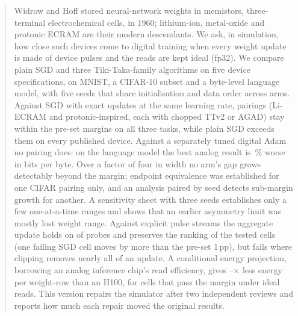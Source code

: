 \begin{abstract}
Widrow and Hoff stored neural-network weights in memistors, three-terminal electrochemical cells, in 1960; lithium-ion,
metal-oxide and protonic ECRAM are their modern descendants. We ask, in simulation, how close such devices come to digital
training when every weight update is made of device pulses and the reads are kept ideal (fp32). We compare plain SGD and three
Tiki-Taka-family algorithms on five device specifications, on MNIST, a CIFAR-10 subset and a byte-level language model, with five
seeds that share initialisation and data order across arms. Against SGD with exact updates at the same learning rate,
\RVAllThreeFpN{} pairings (Li-ECRAM and protonic-inspired, each with chopped TTv2 or AGAD) stay within the pre-set margins on all
three tasks, while plain SGD exceeds them on every published device. Against a separately tuned digital Adam no pairing does: on
the language model the best analog result is \RVLmAdamBestGap\,\% worse in bits per byte. Over a factor of four in width no
arm's gap grows detectably beyond the margin; endpoint equivalence was established for one CIFAR pairing only, and an analysis
paired by seed detects sub-margin growth for another. A sensitivity sheet with three seeds establishes only a few one-at-a-time
ranges and shows that an earlier asymmetry limit was mostly lost weight range. Against explicit pulse streams the aggregate
update holds on \RXProbeSurPassN{} of \RXProbeN{} probes and preserves the ranking of the tested cells (one failing SGD cell moves by more than the pre-set 1\,pp), but fails where clipping
removes nearly all of an update. A conditional energy projection, borrowing an analog inference chip's read efficiency, gives
\RVenSysMin--\RVenChipMax$\times$ less energy per weight-row than an H100, for cells that pass the margin under ideal reads. This
version repairs the simulator after two independent reviews and reports how much each repair moved the original results.
\end{abstract}
